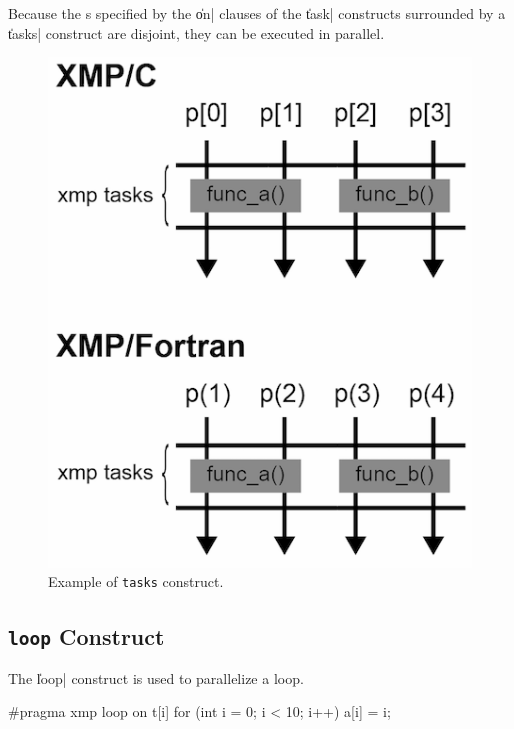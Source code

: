 Because the {\nset}s specified by the \|on| clauses of the \|task|
constructs surrounded by a \|tasks| construct are disjoint, they can be
executed in parallel.

\begin{figure}
  \centering
  \includegraphics[width=0.9\columnwidth]{figs/tasks.png}
  \caption{Example of {\tt tasks} construct.}
\end{figure}


\subsection{{\tt loop} Construct}

The \|loop| construct is used to parallelize a loop.

\begin{XCexample}
#pragma xmp loop on t[i]
  for (int i = 0; i < 10; i++)
    a[i] = i;
\end{XCexample}


